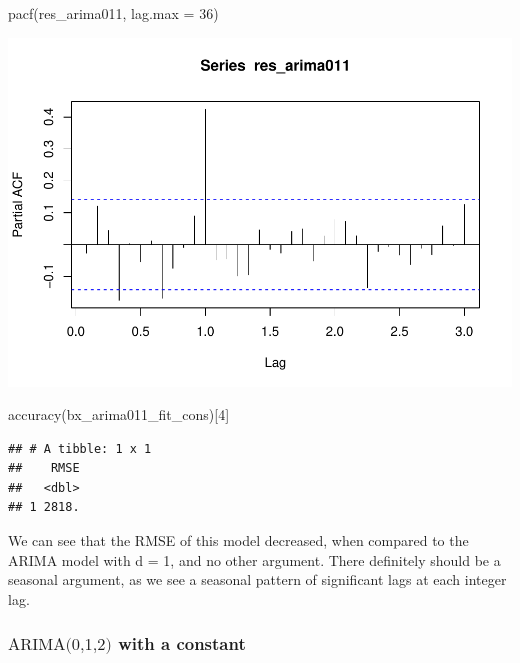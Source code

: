 \documentclass[
]{article}
\newenvironment{Shaded}{\begin{snugshade}}{\end{snugshade}}
\newcommand{\AttributeTok}[1]{\textcolor[rgb]{0.77,0.63,0.00}{#1}}
\newcommand{\DecValTok}[1]{\textcolor[rgb]{0.00,0.00,0.81}{#1}}
\newcommand{\FunctionTok}[1]{\textcolor[rgb]{0.00,0.00,0.00}{#1}}
\newcommand{\NormalTok}[1]{#1}
\begin{document}
\begin{Shaded}
\begin{Highlighting}[]
\FunctionTok{pacf}\NormalTok{(res\_arima011, }\AttributeTok{lag.max =} \DecValTok{36}\NormalTok{)}
\end{Highlighting}
\end{Shaded}

\includegraphics{eighth_meeting_notes_files/figure-latex/arima011-2.pdf}

\begin{Shaded}
\begin{Highlighting}[]
\FunctionTok{accuracy}\NormalTok{(bx\_arima011\_fit\_cons)[}\DecValTok{4}\NormalTok{]}
\end{Highlighting}
\end{Shaded}

\begin{verbatim}
## # A tibble: 1 x 1
##    RMSE
##   <dbl>
## 1 2818.
\end{verbatim}

We can see that the RMSE of this model decreased, when compared to the
ARIMA model with d = 1, and no other argument. There definitely should
be a seasonal argument, as we see a seasonal pattern of significant lags
at each integer lag.

\hypertarget{textarima012-with-a-constant}{%
\subsubsection{\texorpdfstring{\(\text{ARIMA(0,1,2)}\) with a
constant}{\textbackslash text\{ARIMA(0,1,2)\} with a constant}}\label{textarima012-with-a-constant}}
\end{document}
